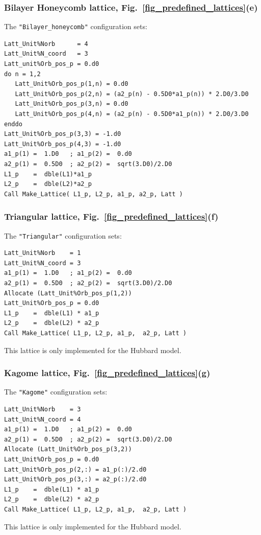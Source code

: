 \subsubsection{Bilayer Honeycomb lattice, Fig.~\ref{fig_predefined_lattices}(e)}
The \texttt{"Bilayer\_honeycomb"} configuration sets:
\begin{lstlisting}[style=fortran]
Latt_Unit%Norb      = 4
Latt_Unit%N_coord   = 3
Latt_unit%Orb_pos_p = 0.d0
do n = 1,2
   Latt_Unit%Orb_pos_p(1,n) = 0.d0 
   Latt_Unit%Orb_pos_p(2,n) = (a2_p(n) - 0.5D0*a1_p(n)) * 2.D0/3.D0
   Latt_Unit%Orb_pos_p(3,n) = 0.d0 
   Latt_Unit%Orb_pos_p(4,n) = (a2_p(n) - 0.5D0*a1_p(n)) * 2.D0/3.D0
enddo
Latt_Unit%Orb_pos_p(3,3) = -1.d0
Latt_Unit%Orb_pos_p(4,3) = -1.d0
a1_p(1) =  1.D0   ; a1_p(2) =  0.d0
a2_p(1) =  0.5D0  ; a2_p(2) =  sqrt(3.D0)/2.D0
L1_p    =  dble(L1)*a1_p
L2_p    =  dble(L2)*a2_p
Call Make_Lattice( L1_p, L2_p, a1_p, a2_p, Latt )
\end{lstlisting}

\subsubsection{Triangular lattice, Fig.~\ref{fig_predefined_lattices}(f)}
The \texttt{"Triangular"} configuration sets:
\begin{lstlisting}[style=fortran]
Latt_Unit%Norb    = 1
Latt_Unit%N_coord = 3
a1_p(1) =  1.D0   ; a1_p(2) =  0.d0
a2_p(1) =  0.5D0  ; a2_p(2) =  sqrt(3.D0)/2.D0
Allocate (Latt_Unit%Orb_pos_p(1,2))
Latt_Unit%Orb_pos_p = 0.d0
L1_p    =  dble(L1) * a1_p
L2_p    =  dble(L2) * a2_p
Call Make_Lattice( L1_p, L2_p, a1_p,  a2_p, Latt )
\end{lstlisting}
This lattice is only implemented  for the Hubbard model. 

\subsubsection{Kagome lattice, Fig.~\ref{fig_predefined_lattices}(g)}
The \texttt{"Kagome"} configuration sets:
\begin{lstlisting}[style=fortran]
Latt_Unit%Norb    = 3
Latt_Unit%N_coord = 4 
a1_p(1) =  1.D0   ; a1_p(2) =  0.d0
a2_p(1) =  0.5D0  ; a2_p(2) =  sqrt(3.D0)/2.D0
Allocate (Latt_Unit%Orb_pos_p(3,2))
Latt_Unit%Orb_pos_p = 0.d0
Latt_Unit%Orb_pos_p(2,:) = a1_p(:)/2.d0
Latt_Unit%Orb_pos_p(3,:) = a2_p(:)/2.d0
L1_p    =  dble(L1) * a1_p
L2_p    =  dble(L2) * a2_p
Call Make_Lattice( L1_p, L2_p, a1_p,  a2_p, Latt )
\end{lstlisting}
This lattice is only implemented  for the Hubbard model. 

